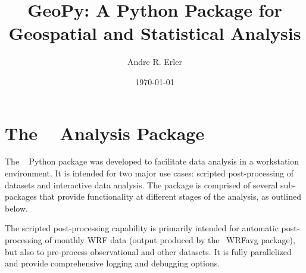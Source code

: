 \documentclass[letterpaper,12pt,headsepline,final]{scrartcl} %
\title{GeoPy: A Python Package for Geospatial and Statistical Analysis}
\author{Andre R. Erler}
\date{\today}
\newcommand{\wrftools}{\mbox{\color{violet} \sffamily WRF~Tools}}
\newcommand{\geopy}{\mbox{\color{teal} \sffamily {GeoPy}}}
\newcommand{\WRFavg}{\mbox{\color{blue} \sffamily WRFavg}}
\begin{document}
\maketitle

\section*{The \geopy{} Analysis Package}
\label{pipe:geopy}
The \geopy{} Python package was developed to facilitate data analysis in a workstation environment. It is intended for two major use cases: scripted post-processing of datasets and interactive data analysis.
The package is comprised of several sub-packages that provide functionality at different stages of the analysis, as outlined below.

The scripted post-processing capability is primarily intended for automatic post-processing of monthly WRF data (output produced by the \WRFavg{} package), but also to pre-process observational and other datasets. It is fully parallelized and provide comprehensive logging and debugging options.
\end{document}
